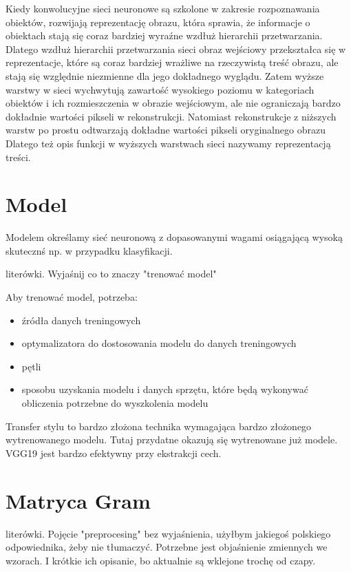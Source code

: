 \documentclass[brudnopis]{xmgr}
\begin{document}
Kiedy konwolucyjne sieci neuronowe są szkolone w zakresie rozpoznawania obiektów, rozwijają reprezentację obrazu, która sprawia, że informacje o obiektach stają się coraz bardziej wyraźne wzdłuż hierarchii przetwarzania. Dlatego wzdłuż hierarchii przetwarzania sieci obraz wejściowy przekształca się w reprezentacje, które są coraz bardziej wrażliwe na rzeczywistą treść obrazu, ale stają się względnie niezmienne dla jego dokładnego wyglądu. Zatem wyższe warstwy w sieci wychwytują zawartość wysokiego poziomu w kategoriach obiektów i ich rozmieszczenia w obrazie wejściowym, ale nie ograniczają bardzo dokładnie wartości pikseli w rekonstrukcji. Natomiast rekonstrukcje z niższych warstw po prostu odtwarzają dokładne wartości pikseli oryginalnego obrazu Dlatego też opis funkcji w wyższych warstwach sieci nazywamy reprezentacją treści.


\section{Model\label{s:dsssl}}
Modelem określamy sieć neuronową z dopasowanymi wagami osiągającą wysoką skutecznś np. w przypadku klasyfikacji.

literówki. Wyjaśnij co to znaczy "trenować model"

Aby trenować model, potrzeba:

\begin{itemize}
\item źródła danych treningowych
\item optymalizatora do dostosowania modelu do danych treningowych 
\item pętli  
\item sposobu uzyskania modelu i danych sprzętu, które będą wykonywać obliczenia potrzebne do wyszkolenia modelu

\end{itemize}

Transfer stylu to bardzo złożona technika wymagająca bardzo złożonego wytrenowanego modelu. Tutaj przydatne okazują się wytrenowane już modele. VGG19 jest bardzo efektywny przy ekstrakcji cech.

\section{Matryca Gram\label{s:dsssl}}

literówki. Pojęcie "preprocesing" bez wyjaśnienia, użyłbym jakiegoś polskiego odpowiednika, żeby nie tłumaczyć. Potrzebne jest objaśnienie zmiennych we wzorach. I krótkie ich opisanie, bo aktualnie są wklejone trochę od czapy.
\end{document}
